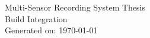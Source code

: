 \documentclass[11pt]{report}
\begin{document}
    \begin{titlepage}
        \centering
        {\LARGE Multi-Sensor Recording System Thesis\\[1ex]}
        {\large Build Integration}\\[2ex]
        {\large Generated on: \today}
    \end{titlepage}

    \tableofcontents
    \clearpage


    
    
    
    
    
    
    \clearpage
    \renewcommand{\bibname}{References}
    
    

    \appendix
    \clearpage
    
    
    
    
    
    
    
    
    
\end{document}
